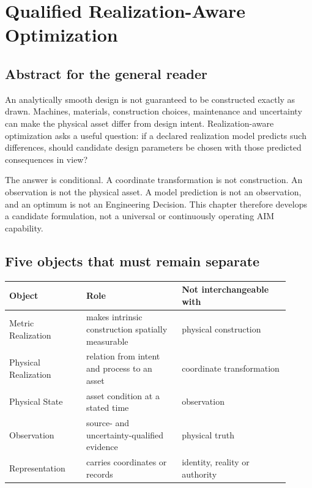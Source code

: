 \chapter{Qualified Realization-Aware Optimization}

\section*{Abstract for the general reader}

An analytically smooth design is not guaranteed to be constructed exactly as
drawn. Machines, materials, construction choices, maintenance and uncertainty
can make the physical asset differ from design intent. Realization-aware
optimization asks a useful question: if a declared realization model predicts
such differences, should candidate design parameters be chosen with those
predicted consequences in view?

The answer is conditional. A coordinate transformation is not construction.
An observation is not the physical asset. A model prediction is not an
observation, and an optimum is not an Engineering Decision. This chapter
therefore develops a candidate formulation, not a universal or continuously
operating AIM capability.

\section{Five objects that must remain separate}

\begin{center}
\small
\begin{tabular}{p{0.25\linewidth}p{0.31\linewidth}p{0.35\linewidth}}
\toprule
Object & Role & Not interchangeable with\\
\midrule
Metric Realization & makes intrinsic construction spatially measurable & physical construction\\
Physical Realization & relation from intent and process to an asset & coordinate transformation\\
Physical State & asset condition at a stated time & observation\\
Observation & source- and uncertainty-qualified evidence & physical truth\\
Representation & carries coordinates or records & identity, reality or authority\\
\bottomrule
\end{tabular}
\end{center}

